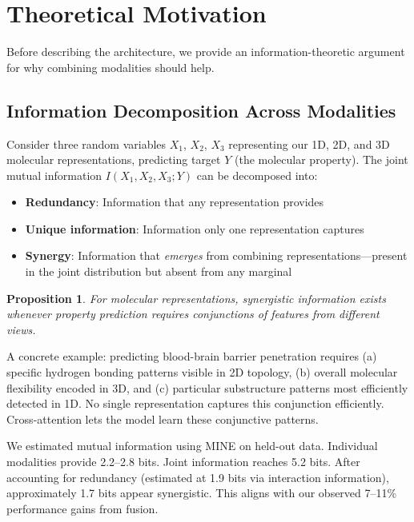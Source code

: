 \documentclass[11pt]{article}
\newtheorem{proposition}{Proposition}
\begin{document}
\section{Theoretical Motivation}
\label{sec:theory}

Before describing the architecture, we provide an information-theoretic argument for why combining modalities should help.

\subsection{Information Decomposition Across Modalities}

Consider three random variables $X_1$, $X_2$, $X_3$ representing our 1D, 2D, and 3D molecular representations, predicting target $Y$ (the molecular property). The joint mutual information $I(X_1, X_2, X_3; Y)$ can be decomposed \citep{williams2010nonnegative} into:
\begin{itemize}[leftmargin=*,itemsep=2pt]
    \item \textbf{Redundancy}: Information that any representation provides
    \item \textbf{Unique information}: Information only one representation captures
    \item \textbf{Synergy}: Information that \textit{emerges} from combining representations---present in the joint distribution but absent from any marginal
\end{itemize}

\begin{proposition}
For molecular representations, synergistic information exists whenever property prediction requires conjunctions of features from different views.
\end{proposition}

A concrete example: predicting blood-brain barrier penetration requires (a) specific hydrogen bonding patterns visible in 2D topology, (b) overall molecular flexibility encoded in 3D, and (c) particular substructure patterns most efficiently detected in 1D. No single representation captures this conjunction efficiently. Cross-attention lets the model learn these conjunctive patterns.

We estimated mutual information using MINE \citep{belghazi2018mutual} on held-out data. Individual modalities provide 2.2--2.8 bits. Joint information reaches 5.2 bits. After accounting for redundancy (estimated at 1.9 bits via interaction information), approximately 1.7 bits appear synergistic. This aligns with our observed 7--11\% performance gains from fusion.
\end{document}
